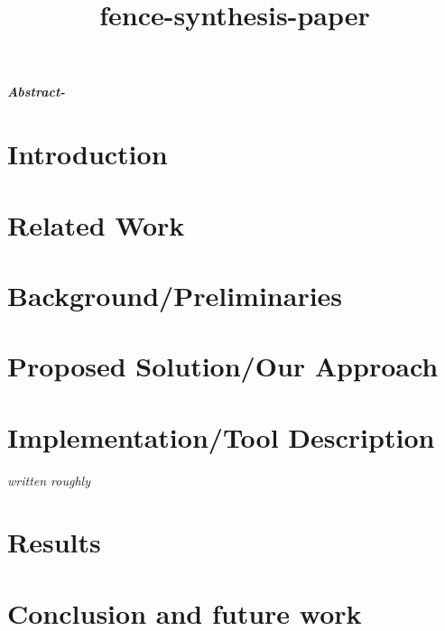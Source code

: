 \documentclass{article}
\title{fence-synthesis-paper}
\date{}
\newcommand{\ishComment}[1]{\textit{\color{red}\tiny{#1}}}
\begin{document}
\maketitle
\textit{\textbf{Abstract-}}

\section{Introduction} \label{sec:intro}


\section{Related Work} \label{sec:related}


\section{Background/Preliminaries} \label{sec:prelim}


%

\section{Proposed Solution/Our Approach}\label{sec:approach}


\section{Implementation/Tool Description}
\ishComment{written roughly}


\section{Results}

\section{Conclusion and future work}



\end{document}
